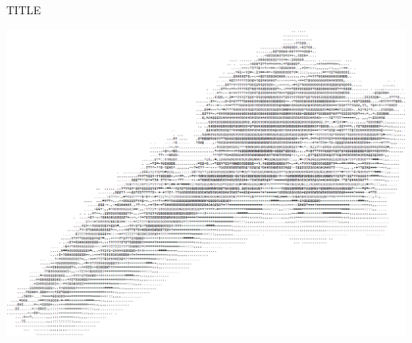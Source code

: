 \thispagestyle{empty}
\begin{center}
  \Huge
	TITLE

  \hspace*{-1in}
    \includegraphics[scale=0.60]{Figures/FrontPage/FrontPage.png}
			
\end{center}



